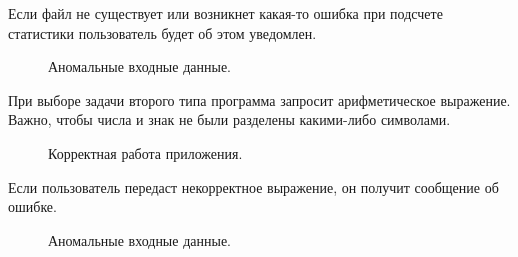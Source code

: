 \documentclass[a4paper,14pt]{extarticle}
\begin{document}
Если файл не существует или возникнет какая-то ошибка при подсчете статистики пользователь будет об этом уведомлен.

\begin{figure}[H]
\caption{Аномальные входные данные.}
\label{1.png}
\end{figure}

При выборе задачи второго типа программа запросит арифметическое выражение. Важно, чтобы числа и знак не были разделены какими-либо символами.

\begin{figure}[H]
\caption{Корректная работа приложения.}
\label{1.png}
\end{figure}

Если пользователь передаст некорректное выражение, он получит сообщение об ошибке.

\begin{figure}[H]
\caption{Аномальные входные данные.}
\label{1.png}
\end{figure}
\end{document}
